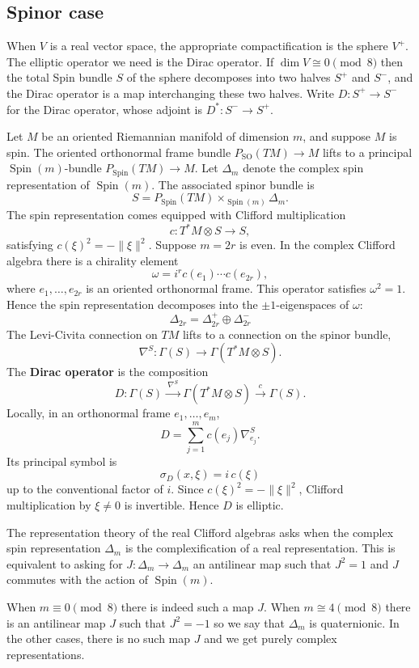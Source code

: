 \documentclass[12pt]{article}
\begin{document}
\subsection{Spinor case}
When $V$ is a real vector space, the appropriate compactification is the sphere $V^+$. The elliptic operator we need is the Dirac operator. If $\dim V \cong 0 \pmod 8$ then the total Spin bundle $S$ of the sphere decomposes into two halves $S^+$ and $S^-$, and the Dirac operator is a map interchanging these two halves. Write $D:S^+\to S^-$ for the Dirac operator, whose adjoint is $D^*:S^-\to S^+$. 
\begin{remark}
    Let $M$ be an oriented Riemannian manifold of dimension $m$, and suppose $M$ is spin. The oriented orthonormal frame bundle $P_{\mathrm{SO}}(TM)\to M$
lifts to a principal $\operatorname{Spin}(m)$-bundle
$P_{\operatorname{Spin}}(TM)\to M$. Let $\Delta_m$ denote the complex spin representation of $\operatorname{Spin}(m)$. The associated
spinor bundle is
\[
S = P_{\operatorname{Spin}}(TM)\times_{\operatorname{Spin}(m)}\Delta_m.
\]
The spin representation comes equipped with Clifford multiplication
\[
c: T^*M\otimes S \longrightarrow S,
\]
satisfying $c(\xi)^2 = -\|\xi\|^2$. Suppose $m=2r$ is even. In the complex Clifford algebra there is a chirality element
\[
\omega = i^r c(e_1)\cdots c(e_{2r}),
\]
where $e_1,\dots,e_{2r}$ is an oriented orthonormal frame. This operator satisfies $\omega^2 = 1$.
Hence the spin representation decomposes into the $\pm1$-eigenspaces of $\omega$:
\[
\Delta_{2r} = \Delta_{2r}^+\oplus\Delta_{2r}^-
\]
The Levi-Civita connection on $TM$ lifts to a connection on the spinor bundle,
\[
\nabla^S : \Gamma(S) \longrightarrow \Gamma(T^*M\otimes S).
\]
The \textbf{Dirac operator} is the composition
\[
D : \Gamma(S) \xrightarrow{\ \nabla^S\ } \Gamma(T^*M\otimes S)
\xrightarrow{\ c\ } \Gamma(S).
\]
Locally, in an orthonormal frame $e_1,\dots,e_m$,
\[
D = \sum_{j=1}^m c(e_j)\nabla^S_{e_j}.
\]
Its principal symbol is
\[
\sigma_D(x,\xi) = i\,c(\xi)
\]
up to the conventional factor of $i$. Since $c(\xi)^2 = -\|\xi\|^2$, Clifford
multiplication by $\xi\neq 0$ is invertible. Hence $D$ is elliptic.


The representation theory of the
real Clifford algebras asks when the complex spin representation $\Delta_m$ is the complexification of a real representation. This is equivalent to asking for $J:\Delta_m\to\Delta_m$ an antilinear map such that $J^2 = 1$ and $J$ commutes with the action of $\operatorname{Spin}(m)$. 

When $m\equiv0\pmod8$ there is indeed such a map $J$. When $m \cong 4 \pmod 8$ there is an antilinear map $J$ such that $J^2 = -1$ so we say that $\Delta_m$ is quaternionic. In the other cases, there is no such map $J$ and we get purely complex representations. 
\end{remark}
\end{document}
